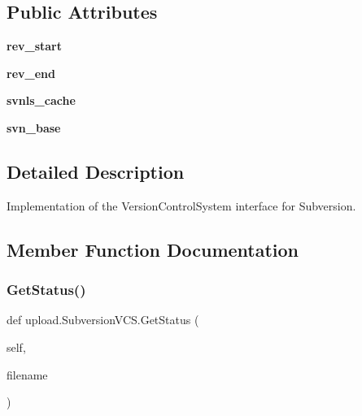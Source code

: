 \subsection*{Public Attributes}
\begin{DoxyCompactItemize}
\item 
\mbox{\label{classupload_1_1_subversion_v_c_s_ad1553a69f4a790309273dbdeb9077732}} 
{\bfseries rev\+\_\+start}
\item 
\mbox{\label{classupload_1_1_subversion_v_c_s_ac0bb07a099c722b7f8622de4b225904f}} 
{\bfseries rev\+\_\+end}
\item 
\mbox{\label{classupload_1_1_subversion_v_c_s_aa801782f807674b06f491df5d7ca9942}} 
{\bfseries svnls\+\_\+cache}
\item 
\mbox{\label{classupload_1_1_subversion_v_c_s_a60645c40d2fea4cd52881576bd13341f}} 
{\bfseries svn\+\_\+base}
\end{DoxyCompactItemize}


\subsection{Detailed Description}
\begin{DoxyVerb}Implementation of the VersionControlSystem interface for Subversion.\end{DoxyVerb}
 

\subsection{Member Function Documentation}
\mbox{\label{classupload_1_1_subversion_v_c_s_ac3785eb1fa561088206d01570f9fe982}} 
\subsubsection{\texorpdfstring{Get\+Status()}{GetStatus()}\hspace{0.1cm}{\footnotesize\ttfamily [1/2]}}
{\footnotesize\ttfamily def upload.\+Subversion\+V\+C\+S.\+Get\+Status (\begin{DoxyParamCaption}\item[{}]{self,  }\item[{}]{filename }\end{DoxyParamCaption})}

